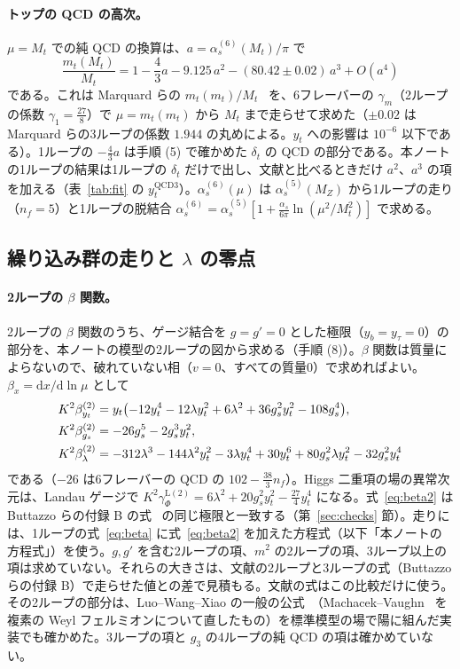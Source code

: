 \documentclass[a4paper,10pt]{ltjsarticle}
\newcommand{\dd}{\mathrm{d}}
\begin{document}
\paragraph{トップの QCD の高次。}$\mu=M_t$ での純 QCD の換算は、$a=\alpha_s^{(6)}(M_t)/\pi$ で
\begin{equation}
\frac{m_t(M_t)}{M_t}=1-\frac43a-9.125\,a^2-(80.42\pm0.02)\,a^3+O(a^4)
\label{eq:mtqcd}
\end{equation}
である。これは Marquard らの $m_t(m_t)/M_t$~\cite{marquard16} を、6フレーバーの $\gamma_m$（2ループの係数 $\gamma_1=\frac{27}8$）で $\mu=m_t(m_t)$ から $M_t$ まで走らせて求めた（$\pm0.02$ は Marquard らの3ループの係数 $1.944$ の丸めによる。$y_t$ への影響は $10^{-6}$ 以下である）。1ループの $-\frac43a$ は手順 (5) で確かめた $\delta_t$ の QCD の部分である。本ノートの1ループの結果は1ループの $\delta_t$ だけで出し、文献と比べるときだけ $a^2$、$a^3$ の項を加える（表~\ref{tab:fit} の $y_t^{\mathrm{QCD3}}$）。$\alpha_s^{(6)}(\mu)$ は $\alpha_s^{(5)}(M_Z)$ から1ループの走り（$n_f=5$）と1ループの脱結合 $\alpha_s^{(6)}=\alpha_s^{(5)}[1+\frac{\alpha_s}{6\pi}\ln(\mu^2/M_t^2)]$ で求める。

\subsection{繰り込み群の走りと $\lambda$ の零点}\label{sec:running}

\paragraph{2ループの $\beta$ 関数。}2ループの $\beta$ 関数のうち、ゲージ結合を $g=g'=0$ とした極限（$y_b=y_\tau=0$）の部分を、本ノートの模型の2ループの図から求める（手順 (8)）。$\beta$ 関数は質量によらないので、破れていない相（$v=0$、すべての質量0）で求めればよい。$\beta_x=\dd x/\dd\ln\mu$ として
\begin{align}
K^2\beta^{(2)}_{y_t}&=y_t\bigl(-12y_t^4-12\lambda y_t^2+6\lambda^2+36g_s^2y_t^2-108g_s^4\bigr),\notag\\
K^2\beta^{(2)}_{g_s}&=-26g_s^5-2g_s^3y_t^2,\label{eq:beta2}\\
K^2\beta^{(2)}_\lambda&=-312\lambda^3-144\lambda^2y_t^2-3\lambda y_t^4+30y_t^6+80g_s^2\lambda y_t^2-32g_s^2y_t^4\notag
\end{align}
である（$-26$ は6フレーバーの QCD の $102-\frac{38}3n_f$）。Higgs 二重項の場の異常次元は、Landau ゲージで $K^2\gamma_\Phi^{\mathrm L(2)}=6\lambda^2+20g_s^2y_t^2-\frac{27}4y_t^4$ になる。式~\eqref{eq:beta2} は Buttazzo らの付録 B の式~\cite{buttazzo13} の同じ極限と一致する（第~\ref{sec:checks} 節）。走りには、1ループの式~\eqref{eq:beta} に式~\eqref{eq:beta2} を加えた方程式（以下「本ノートの方程式」）を使う。$g,g'$ を含む2ループの項、$m^2$ の2ループの項、3ループ以上の項は求めていない。それらの大きさは、文献の2ループと3ループの式（Buttazzo らの付録 B）で走らせた値との差で見積もる。文献の式はこの比較だけに使う。その2ループの部分は、Luo--Wang--Xiao の一般の公式~\cite{luo03}（Machacek--Vaughn~\cite{mv1,mv2,mv3} を複素の Weyl フェルミオンについて直したもの）を標準模型の場で陽に組んだ実装でも確かめた。3ループの項と $g_3$ の4ループの純 QCD の項は確かめていない。
\end{document}
